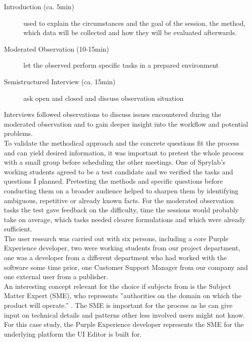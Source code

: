 \begin{description}
  \item [Introduction (ca. 5min)] used to explain the circumstances and the goal of the session, the method, which data will be collected and how they will be evaluated afterwards.
  \item [Moderated Observation (10-15min)] let the observed perform specific tasks in a prepared environment
  \item [Semistructured Interview (ca. 15min)] ask open and closed and discuss observation situation
\end{description}
Interviews followed observations to discuss issues encountered during the moderated observation and to gain deeper insight into the workflow and potential problems.
\\
To validate the methodical approach and the concrete questions fit the process and can yield desired information, it was important to pretest the whole process with a small group before scheduling the other meetings. One of Sprylab's working students agreed to be a test candidate and we verified the tasks and questions I planned.
Pretesting the methods and specific questions before conducting them on a broader audience helped to sharpen them by identifying ambiguous, repetitive or already known facts.
For the moderated observation tasks the test gave feedback on the difficulty, time the sessions would probably take on average, which tasks needed clearer formulations and which were already sufficient.
\\
The user research was carried out with six persons, including a core Purple Experience developer, two were working students from our project department, one was a developer from a different department who had worked with the software some time prior, one Customer Support Manager from our company and one external user from a publisher.
\\
An interesting concept relevant for the choice if subjects from \cite[p. 41]{AboutFace:2014ys} is the Subject Matter Expert (SME), who represents ''authorities on the domain on which the product will operate.'' \cite[p. 41]{AboutFace:2014ys}. The SME is important for the process as he can give input on technical details and patterns other less involved users might not know. For this case study, the Purple Experience developer represents the SME for the underlying platform the UI Editor is built for.

